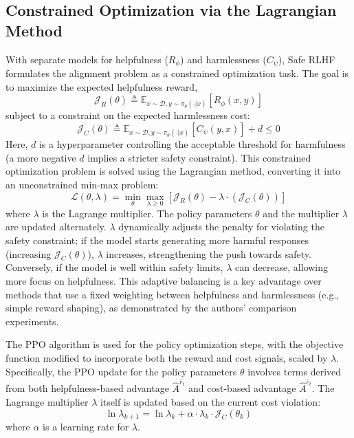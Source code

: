 \documentclass{article}
\begin{document}
\subsection{Constrained Optimization via the Lagrangian Method}
With separate models for helpfulness ($R_\phi$) and harmlessness ($C_\psi$), Safe RLHF formulates the alignment problem as a constrained optimization task. \cite{Dai2023SafeRLHF} The goal is to maximize the expected helpfulness reward,
\begin{equation}
    \label{eq:j_r}
    \mathcal{J}_R(\theta) \triangleq \mathbb{E}_{x \sim \mathcal{D}, y \sim \pi_\theta(\cdot|x)}[R_\phi(x,y)]
\end{equation}
subject to a constraint on the expected harmlessness cost:
\begin{equation}
    \label{eq:j_c}
    \mathcal{J}_C(\theta) \triangleq \mathbb{E}_{x \sim \mathcal{D}, y \sim \pi_\theta(\cdot|x)}[C_\psi(y,x)] + d \le 0
\end{equation}
Here, $d$ is a hyperparameter controlling the acceptable threshold for harmfulness (a more negative $d$ implies a stricter safety constraint).
This constrained optimization problem is solved using the Lagrangian method, converting it into an unconstrained min-max problem:
\begin{equation}
    \label{eq:lagrangian_method}
    \mathcal{L}(\theta, \lambda) = \min_{\theta} \max_{\lambda \ge 0} \left[\mathcal{J}_R(\theta) - \lambda \cdot (\mathcal{J}_C(\theta))\right]
\end{equation}
where $\lambda$ is the Lagrange multiplier. The policy parameters $\theta$ and the multiplier $\lambda$ are updated alternately. $\lambda$ dynamically adjusts the penalty for violating the safety constraint; if the model starts generating more harmful responses (increasing $\mathcal{J}_C(\theta)$), $\lambda$ increases, strengthening the push towards safety. Conversely, if the model is well within safety limits, $\lambda$ can decrease, allowing more focus on helpfulness. This adaptive balancing is a key advantage over methods that use a fixed weighting between helpfulness and harmlessness (e.g., simple reward shaping), as demonstrated by the authors' comparison experiments. \cite{Dai2023SafeRLHF}

The PPO algorithm is used for the policy optimization steps, with the objective function modified to incorporate both the reward and cost signals, scaled by $\lambda$. Specifically, the PPO update for the policy parameters $\theta$ involves terms derived from both helpfulness-based advantage $\hat{A}^{\hat{r}_t}$ and cost-based advantage $\hat{A}^{\hat{c}_t}$. \cite{Dai2023SafeRLHF} The Lagrange multiplier $\lambda$ itself is updated based on the current cost violation:
\begin{equation}
    \label{eq:lambda_update}
    \ln \lambda_{k+1} = \ln \lambda_k + \alpha \cdot \lambda_k \cdot \mathcal{J}_C(\theta_k)
\end{equation}
where $\alpha$ is a learning rate for $\lambda$.
\end{document}
